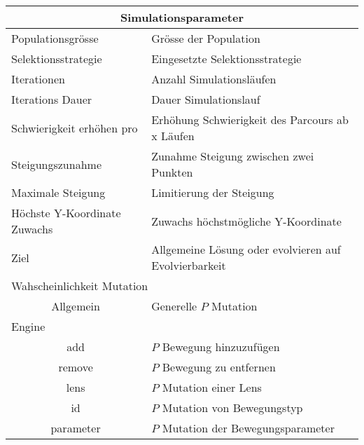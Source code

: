
    \begin{tabular}{ | l | l | }
      \hline
      \multicolumn{2}{|c|}{Simulationsparameter} \\
      \hline
      Populationsgrösse & Grösse der Population \\ \hline
      Selektionsstrategie & Eingesetzte Selektionsstrategie \\ \hline
      Iterationen & Anzahl Simulationsläufen \\ \hline
      Iterations Dauer & Dauer Simulationslauf \\ \hline
      Schwierigkeit erhöhen pro & Erhöhung Schwierigkeit des Parcours ab x Läufen \\ \hline
      Steigungszunahme & Zunahme Steigung zwischen zwei Punkten \\ \hline
      Maximale Steigung & Limitierung der Steigung\\ \hline
      Höchste Y-Koordinate Zuwachs & Zuwachs höchstmögliche Y-Koordinate \\ \hline
      Ziel & Allgemeine Lösung oder evolvieren auf Evolvierbarkeit \\ \hline
      \multicolumn{2}{|l|}{Wahscheinlichkeit Mutation}\\ \hline
      \multicolumn{1}{|c|}{Allgemein} & Generelle \(P\) Mutation \\ \hline
      Engine &  \\ \hline
      \multicolumn{1}{|c|}{add} & \(P\) Bewegung hinzuzufügen \\ \hline
      \multicolumn{1}{|c|}{remove} & \(P\) Bewegung zu entfernen \\ \hline
      \multicolumn{1}{|c|}{lens} & \(P\) Mutation einer Lens \\ \hline
      \multicolumn{1}{|c|}{id} & \(P\) Mutation von Bewegungstyp\\ \hline
      \multicolumn{1}{|c|}{parameter} & \(P\) Mutation der Bewegungsparameter \\ \hline
    \end{tabular}
